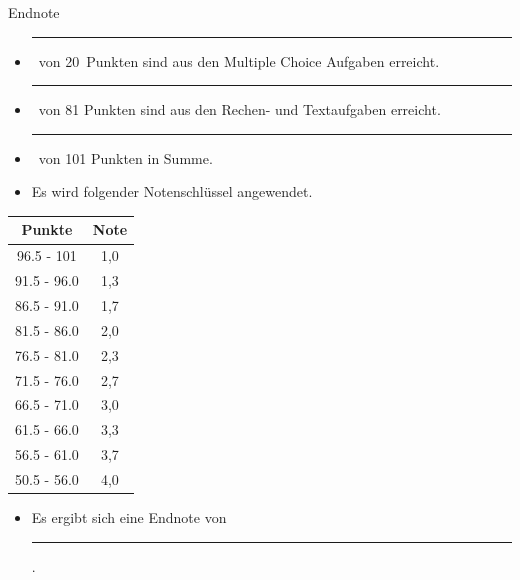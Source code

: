 \documentclass[a4paper, 9pt]{scrartcl}\usepackage[]{graphicx}\usepackage[]{xcolor}
\begin{document}
\begin{graybox}{Endnote}
  \vspace{1Ex}
  \begin{itemize}
  \item[] \rule[0ex]{3em}{.4pt}\, von 20\, Punkten sind aus den Multiple
    Choice Aufgaben erreicht.
  \item[] \rule[0ex]{3em}{.4pt}\, von 81 Punkten sind aus den Rechen- und
    Textaufgaben erreicht. 
  \item[] \rule[0ex]{3em}{.4pt}\, von 101 Punkten in Summe.
  \item[] Es wird folgender Notenschlüssel angewendet.   
  \end{itemize}
  \vspace{1ex}
\begin{center}
  \begin{tabular}[c]{cc}
    \toprule
    \textbf{Punkte}	&	\textbf{Note}	\\
    \midrule
    96.5 - 101	&	1,0	\\
    91.5 - 96.0	&	1,3	\\
    86.5 - 91.0	&	1,7	\\
    81.5 - 86.0	&	2,0	\\
    76.5 - 81.0	&	2,3	\\
    71.5 - 76.0	&	2,7	\\
    66.5 - 71.0	&	3,0	\\
    61.5 - 66.0	&	3,3	\\
    56.5 - 61.0	&	3,7	\\
    50.5 - 56.0	&	4,0	\\
    \bottomrule
  \end{tabular}
\end{center}
  \vspace{1ex}
\begin{itemize}
\item[] Es ergibt sich eine Endnote von \rule[0ex]{4em}{.4pt}.
\end{itemize}
  \vspace{1Ex}
\end{graybox}

\newpage
\end{document}

